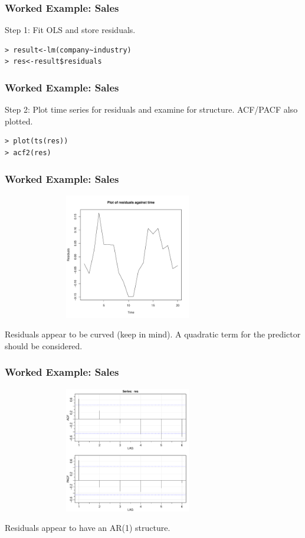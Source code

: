 \documentclass[%
xcolor=pdftex]{beamer}
\begin{document}
\begin{frame}[fragile]
\frametitle{Worked Example: Sales}

Step 1: Fit OLS and store residuals.

\begin{verbatim}
> result<-lm(company~industry)
> res<-result$residuals
\end{verbatim}

\end{frame}

\begin{frame}[fragile]
\frametitle{Worked Example: Sales}


Step 2: Plot time series for residuals and examine for structure. ACF/PACF also plotted.

\begin{verbatim}
> plot(ts(res))
> acf2(res)
\end{verbatim}

\end{frame}

\begin{frame}
\frametitle{Worked Example: Sales}

\includegraphics[width=110mm, height=55mm]{ts.pdf}

Residuals appear to be curved (keep in mind). A quadratic term for the predictor should be considered.

\end{frame}

\begin{frame}
\frametitle{Worked Example: Sales}

\includegraphics[width=110mm, height=55mm]{acfs.pdf}

Residuals appear to have an AR(1) structure.

\end{frame}
\end{document}
